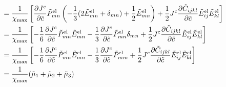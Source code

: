 \documentclass[../main.tex]{subfiles}
\begin{document}
\begin{align}
    &= \fc{1}{\xmax}\left[\pdiff{\jc}{\tc} \tPel{mn} \left( -\fc{1}{3}(2\tEel{mn}+\delta_{mn})+ \fc{1}{2} \tEel{mn}\right)+ \fc{1}{2}\jc \pdiff{\td{C}_{ijkl}}{\tc}\tEel{ij}\tEel{kl} \right] \\
    &= \fc{1}{\xmax}\left[-\fc{1}{6}\pdiff{\jc}{\tc} \tPel{mn} \tEel{mn} - \fc{1}{3}\pdiff{\jc}{\tc} \tPel{mn}\delta_{mn} +  \fc{1}{2}\jc \pdiff{\td{C}_{ijkl}}{\tc}\tEel{ij}\tEel{kl} \right] \\
    &= \fc{1}{\xmax}\left[-\fc{1}{6}\pdiff{\jc}{\tc} \tPel{mn} \tEel{mn} - \fc{1}{3 }\pdiff{\jc}{\tc} \tPel{mm} +  \fc{1}{2}\jc \pdiff{\td{C}_{ijkl}}{\tc}\tEel{ij}\tEel{kl} \right] \\
    &= \frac{1}{\xmax}(\td{\mu}_1 + \td{\mu}_2 + \td{\mu}_3)
\end{align}
\end{document}
